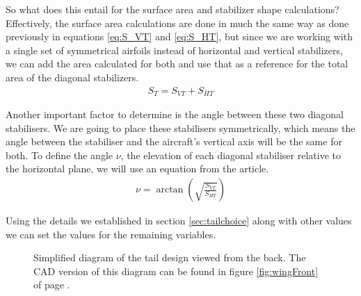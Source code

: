 \documentclass[english,fira]{ist-report}
\begin{document}
So what does this entail for the surface area and stabilizer shape calculations? Effectively, the surface area calculations are done in much the same way as done previously in equations \ref{eq:S_VT} and \ref{eq:S_HT}, but since we are working with a single set of symmetrical airfoils instead of horizontal and vertical stabilizers, we can add the area calculated for both and use that as a reference for the total area of the diagonal stabilizers.
\begin{gather}
	S_T = S_{VT} + S_{HT}
\end{gather}

Another important factor to determine is the angle between these two diagonal stabilisers. We are going to place these stabilisers symmetrically, which means the angle between the stabiliser and the aircraft's vertical axis will be the same for both. To define the angle $\nu$, the elevation of each diagonal stabiliser relative to the horizontal plane, we will use an equation from the  \cite{vleitwerke} article.
\begin{gather}
	\nu = \arctan\left(\sqrt{\frac{S_{VT}}{S_{HT}}}\right)
\end{gather}

Using the details we established in section \ref{sec:tailchoice} along with other values we can set the values for the remaining variables.
\begin{figure}[ht]
    \centering
    \caption[Simplified diagram of the tail design viewed from the back.]{Simplified diagram of the tail design viewed from the back. The CAD version of this diagram can be found in figure \ref{fig:wingFront} of page \pageref{fig:wingFront}.}
    \label{fig:tail_backview}
\end{figure}
\end{document}
